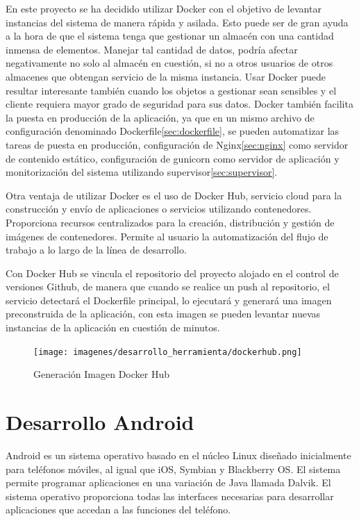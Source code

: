 \documentclass[a4paper,11pt]{book}
\begin{document}
En este proyecto se ha decidido utilizar Docker con el objetivo de levantar instancias del sistema de manera rápida y asilada. Esto puede ser de gran ayuda a la hora de que el sistema tenga que gestionar un almacén con una cantidad inmensa de elementos. Manejar tal cantidad de datos, podría afectar negativamente no solo al almacén en cuestión, si no a otros usuarios de otros almacenes que obtengan servicio de la misma instancia. Usar Docker puede resultar interesante también cuando los objetos a gestionar sean sensibles y el cliente requiera mayor grado de seguridad para sus datos. Docker también facilita la puesta en producción de la aplicación, ya que en un mismo archivo de configuración denominado Dockerfile\ref{sec:dockerfile}, se pueden automatizar las tareas de puesta en producción, configuración de Nginx\ref{sec:nginx} como servidor de contenido estático, configuración de gunicorn como servidor de aplicación y monitorización del sistema utilizando supervisor\ref{sec:supervisor}. 

Otra ventaja de utilizar Docker es el uso de Docker Hub\cite{dkh}, servicio cloud para la construcción y envío de aplicaciones o servicios utilizando contenedores. Proporciona recursos centralizados para la creación, distribución y gestión de imágenes de contenedores. Permite al usuario la automatización del flujo de trabajo a lo largo de la línea de desarrollo.

Con Docker Hub se vincula el repositorio del proyecto alojado en el control de versiones Github, de manera que cuando se realice un push al repositorio, el servicio detectará el Dockerfile principal, lo ejecutará y generará una imagen preconstruida de la aplicación, con esta imagen se pueden levantar nuevas instancias de la aplicación en cuestión de minutos. 


\begin{figure}[H] 
\centering 
\texttt{[image: imagenes/desarrollo\_herramienta/dockerhub.png]}
\caption{ Generación Imagen Docker Hub\cite{dkh2}}
\end{figure}


\section{Desarrollo Android}

Android es un sistema operativo basado en el núcleo Linux diseñado inicialmente para teléfonos móviles, al igual que iOS, Symbian y Blackberry OS. El sistema permite programar aplicaciones en una variación de Java llamada Dalvik. El sistema operativo proporciona todas las interfaces necesarias para desarrollar aplicaciones que accedan a las funciones del teléfono. 
\end{document}
